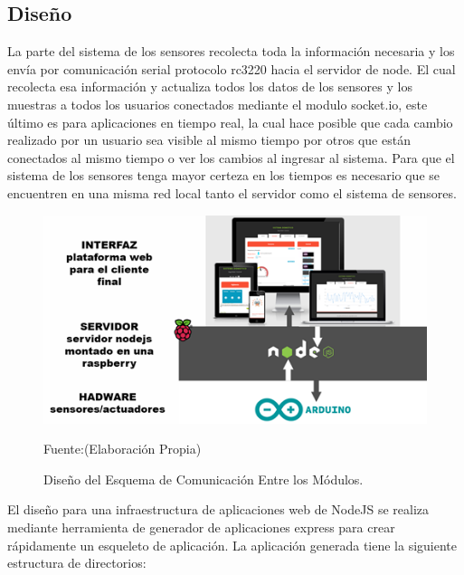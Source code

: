 \documentclass[11pt,letterpaper]{report}
\begin{document}
		\subsection{Diseño}
		La parte del sistema de los sensores recolecta toda la información necesaria y los envía por comunicación serial protocolo rc3220 hacia el servidor  de node. El cual recolecta esa información y  actualiza todos los datos de los sensores y los muestras a todos  los usuarios conectados mediante el modulo socket.io, este último es para aplicaciones en tiempo real, la cual hace posible que cada cambio realizado por un usuario sea visible al  mismo tiempo por otros que están conectados al mismo tiempo o ver los cambios  al ingresar al sistema. Para que el sistema de los sensores tenga mayor certeza en los tiempos es necesario que se encuentren en una  misma red local tanto el servidor como el sistema de sensores.
		\begin{figure}[ht]
		\centering
		\includegraphics[scale=0.9]{imagenes/arquitectura.png}
		\caption{Diseño del Esquema de Comunicación Entre los Módulos.}
		 Fuente:(Elaboración Propia)
		\label{modulos} 
		\end{figure}
El diseño para una infraestructura de aplicaciones web de NodeJS se realiza mediante herramienta de generador de aplicaciones express para crear rápidamente un esqueleto de aplicación. La aplicación generada tiene la siguiente estructura de directorios:
\end{document}
